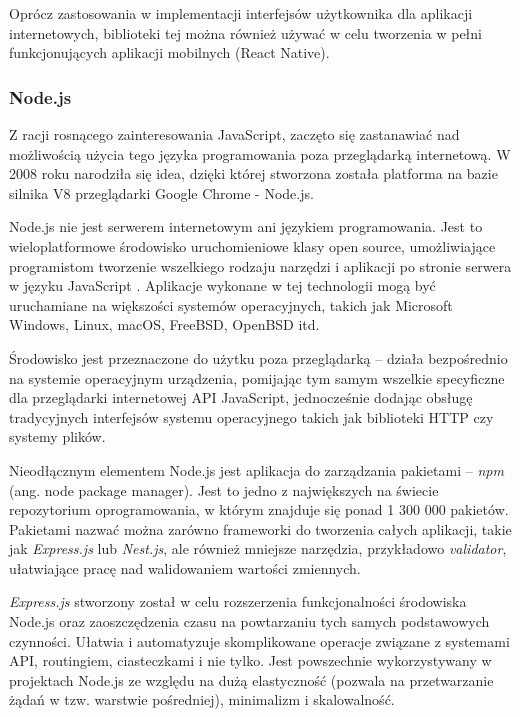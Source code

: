 \documentclass[12pt,twoside]{article}
\begin{document}
Oprócz zastosowania w implementacji interfejsów użytkownika dla aplikacji internetowych, biblioteki tej można również używać w celu tworzenia w pełni funkcjonujących aplikacji mobilnych (React Native).

\subsubsection{Node.js}

Z racji rosnącego zainteresowania JavaScript, zaczęto się zastanawiać nad możliwością użycia tego języka programowania poza przeglądarką internetową. W 2008 roku narodziła się idea, dzięki której stworzona została platforma na bazie silnika V8 przeglądarki Google Chrome - Node.js. 

Node.js nie jest serwerem internetowym ani językiem programowania. Jest to wieloplatformowe środowisko uruchomieniowe klasy open source, umożliwiające programistom tworzenie wszelkiego rodzaju narzędzi i aplikacji po stronie serwera w języku JavaScript \cite{NodejsWhatIs}. Aplikacje wykonane w tej technologii mogą być uruchamiane na większości systemów operacyjnych, takich jak Microsoft Windows, Linux, macOS, FreeBSD, OpenBSD itd.

Środowisko jest przeznaczone do użytku poza przeglądarką -- działa bezpośrednio na systemie operacyjnym urządzenia, pomijając tym samym wszelkie specyficzne dla przeglądarki internetowej API JavaScript, jednocześnie dodając obsługę tradycyjnych interfejsów systemu operacyjnego takich jak biblioteki HTTP czy systemy plików.

Nieodłącznym elementem Node.js jest aplikacja do zarządzania pakietami -- \emph{npm} (ang. node package manager). Jest to jedno z największych na świecie repozytorium oprogramowania, w którym znajduje się ponad 1 300 000 pakietów. Pakietami nazwać można zarówno frameworki do tworzenia całych aplikacji, takie jak \emph{Express.js} lub \emph{Nest.js}, ale również mniejsze narzędzia, przykładowo \emph{validator}, ułatwiające pracę nad walidowaniem wartości zmiennych.

\emph{Express.js} stworzony został w celu rozszerzenia funkcjonalności środowiska Node.js oraz zaoszczędzenia czasu na powtarzaniu tych samych podstawowych czynności. Ułatwia i automatyzuje skomplikowane operacje związane z systemami API, routingiem, ciasteczkami i nie tylko. Jest powszechnie wykorzystywany w projektach Node.js ze względu na dużą elastyczność (pozwala na przetwarzanie żądań w tzw. warstwie pośredniej), minimalizm i skalowalność.
\end{document}
